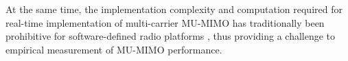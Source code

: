 At the same time, the implementation complexity and computation required for real-time implementation of multi-carrier \ac{MU-MIMO} has traditionally been prohibitive for software-defined radio platforms \cite{aryafar2010design}, thus providing a challenge to empirical measurement of \ac{MU-MIMO} performance.

%
%
%
%

%
%
%

